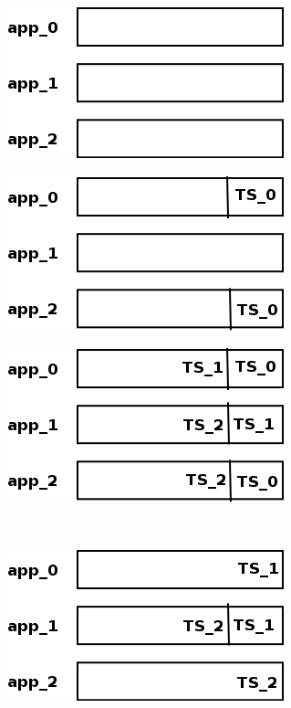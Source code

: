 \begin{figure}
  \centering
  \begin{subfigure}[t]{0.3\textwidth}
    \includegraphics[scale=0.4]{resources/images/Implementation/commit_system_0.png}
    \caption{}
    \label{fig:impl_tx_aggr_sub0}
  \end{subfigure}
  \hfill
  \begin{subfigure}[t]{0.3\textwidth}
    \includegraphics[scale=0.4]{resources/images/Implementation/commit_system_1.png}
    \caption{}
    \label{fig:impl_tx_aggr_sub1}
  \end{subfigure}
  \hfill
  \begin{subfigure}[t]{0.3\textwidth}
    \includegraphics[scale=0.4]{resources/images/Implementation/commit_system_2.png}
    \caption{}
    \label{fig:impl_tx_aggr_sub2}
  \end{subfigure}
  \\[2em]
  \begin{subfigure}[t]{0.3\textwidth}
    \includegraphics[scale=0.4]{resources/images/Implementation/commit_system_3.png}

\end{subfigure}
\end{figure}
